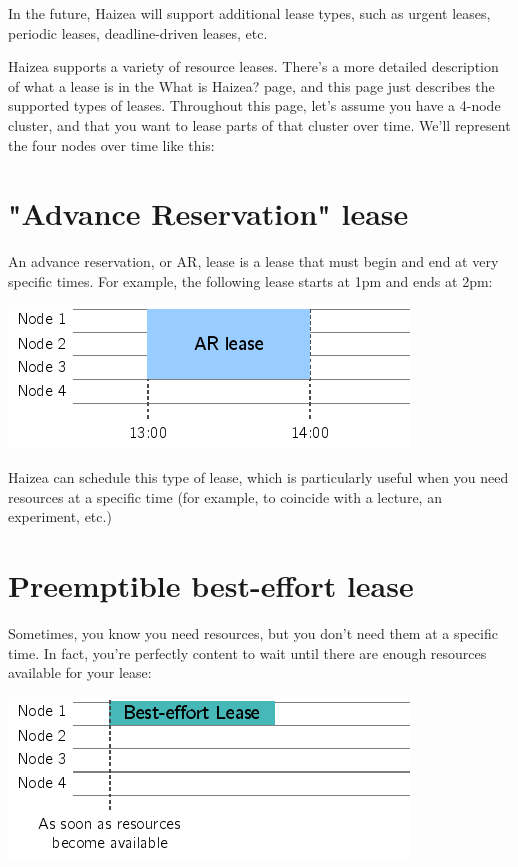 In the future, Haizea will support additional lease types, such as urgent leases, periodic leases, deadline-driven leases, etc.


Haizea supports a variety of resource leases. There's a more detailed description of what a lease is in the What is Haizea? page, and this page just describes the supported types of leases. Throughout this page, let's assume you have a 4-node cluster, and that you want to lease parts of that cluster over time. We'll represent the four nodes over time like this:

\section{"Advance Reservation" lease}

An advance reservation, or AR, lease is a lease that must begin and end at very specific times. For example, the following lease starts at 1pm and ends at 2pm:

\begin{center}
\includegraphics{images/lease_ar.png}
\end{center}

Haizea can schedule this type of lease, which is particularly useful when you need resources at a specific time (for example, to coincide with a lecture, an experiment, etc.)

\section{Preemptible best-effort lease}

Sometimes, you know you need resources, but you don't need them at a specific time. In fact, you're perfectly content to wait until there are enough resources available for your lease:

\begin{center}
\includegraphics{images/lease_be1.png}
\end{center}


